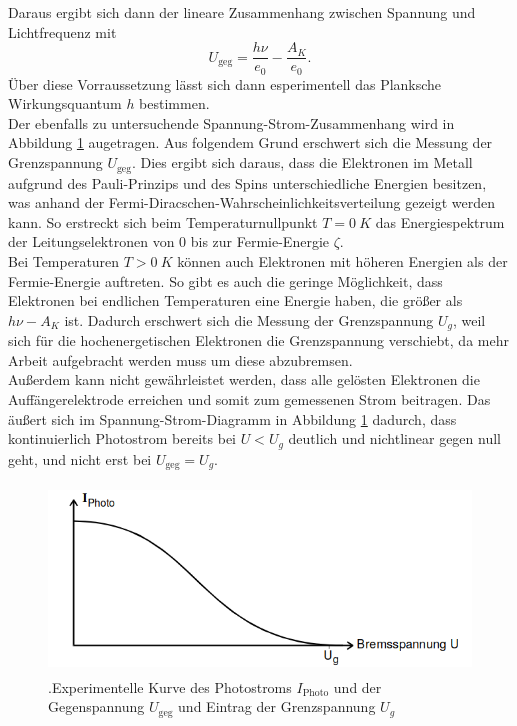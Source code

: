 Daraus ergibt sich dann der lineare Zusammenhang zwischen Spannung und Lichtfrequenz mit
\begin{equation}
    \label{eqn:lin}
    U_\text{geg} = \frac{h \nu}{e_0} - \frac{A_K}{e_0}.
\end{equation}
Über diese Vorraussetzung lässt sich dann esperimentell das Planksche Wirkungsquantum $h$ bestimmen. \\

Der ebenfalls zu untersuchende Spannung-Strom-Zusammenhang wird in Abbildung \ref{fig:diagramm} augetragen.
Aus folgendem Grund erschwert sich die Messung der Grenzspannung $U_\text{geg}$.
Dies ergibt sich daraus, dass die Elektronen im Metall aufgrund des Pauli-Prinzips und des Spins unterschiedliche Energien besitzen, was anhand der Fermi-Diracschen-Wahrscheinlichkeitsverteilung gezeigt werden kann.
So erstreckt sich beim Temperaturnullpunkt $T = \SI{0}{K}$ das Energiespektrum der Leitungselektronen von 0 bis zur Fermie-Energie $\zeta$.\\
Bei Temperaturen $T > \SI{0}{K}$ können auch Elektronen mit höheren Energien als der Fermie-Energie auftreten.
So gibt es auch die geringe Möglichkeit, dass Elektronen bei endlichen Temperaturen eine Energie haben, die größer als $h \nu - A_K$ ist.
Dadurch erschwert sich die Messung der Grenzspannung $U_g$, weil sich für die hochenergetischen Elektronen die Grenzspannung verschiebt, da mehr Arbeit aufgebracht werden muss um diese abzubremsen.\\

Außerdem kann nicht gewährleistet werden, dass alle gelösten Elektronen die Auffängerelektrode erreichen und somit zum gemessenen Strom beitragen.
Das äu\ss{}ert sich im Spannung-Strom-Diagramm in Abbildung \ref{fig:diagramm} dadurch, dass  kontinuierlich Photostrom bereits bei $U < U_g$ deutlich und nichtlinear gegen null geht, und nicht erst bei $U_\text{geg} = U_g$.

\begin{figure}[h]
    \centering
    \includegraphics[height=5cm]{Theorie/Diagramm.png}
    \caption{.Experimentelle Kurve des Photostroms $I_\text{Photo}$ und der Gegenspannung $U_\text{geg}$ und Eintrag der Grenzspannung $U_g$}
    \label{fig:diagramm}
\end{figure}

